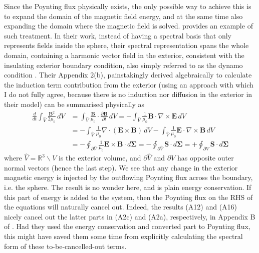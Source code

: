 Since the Poynting flux physically exists, the only possible way to achieve this is to expand the domain of the magnetic field energy, and at the same time also expanding the domain where the magnetic field is solved.
\citet{gerick_interannual_2024} provides an example of such treatment. In their work, instead of having a spectral basis that only represents fields inside the sphere, their spectral representation spans the whole domain, containing a harmonic vector field in the exterior, consistent with the insulating exterior boundary condition, also simply referred to as the dynamo condition \citep{roberts_803_2015}.
Their Appendix 2(b), painstakingly derived algebraically to calculate the induction term contribution from the exterior (using an approach with which I do not fully agree, because there is no induction nor diffusion in the exterior in their model) can be summarised physically as 
%
\begin{equation}
\begin{aligned}
    \frac{d}{dt}\int_{\hat{V}} \frac{\mathbf{B}^2}{2\mu_0} \, dV &= \int_{\hat{V}} \frac{\mathbf{B}}{\mu_0}\cdot \frac{\partial \mathbf{B}}{\partial t} \, dV = - \int_{\hat{V}} \frac{1}{\mu_0} \mathbf{B} \cdot \nabla\times \mathbf{E} \, dV \\ 
    &= - \int_{\hat{V}} \frac{1}{\mu_0} \nabla\cdot (\mathbf{E} \times \mathbf{B}) \, dV - \int_{\hat{V}} \frac{1}{\mu_0} \mathbf{E} \cdot \nabla\times \mathbf{B} \, dV \\ 
    &= -\oint_{\partial \hat{V}} \frac{1}{\mu_0} \mathbf{E} \times \mathbf{B} \cdot d\boldsymbol{\Sigma} = - \oint_{\partial \hat{V}} \mathbf{S}\cdot d\boldsymbol{\Sigma} = + \oint_{\partial V} \mathbf{S}\cdot d\boldsymbol{\Sigma}
\end{aligned}
\end{equation}
%
where $\hat{V} = \mathbb{R}^3 \backslash V$ is the exterior volume, and $\partial \hat{V}$ and $\partial V$ has opposite outer normal vectors (hence the last step). We see that any change in the exterior magnetic energy is injected by the outflowing Poynting flux across the boundary, i.e. the sphere. The result is no wonder here, and is plain energy conservation. If this part of energy is added to the system, then the Poynting flux on the RHS of the equations will naturally cancel out. Indeed, the results (A12) and (A16) nicely cancel out the latter parts in (A2c) and (A2a), respectively, in Appendix B of \citet{gerick_interannual_2024}. Had they used the energy conservation and converted part to Poynting flux, this might have saved them some time from explicitly calculating the spectral form of these to-be-cancelled-out terms.

